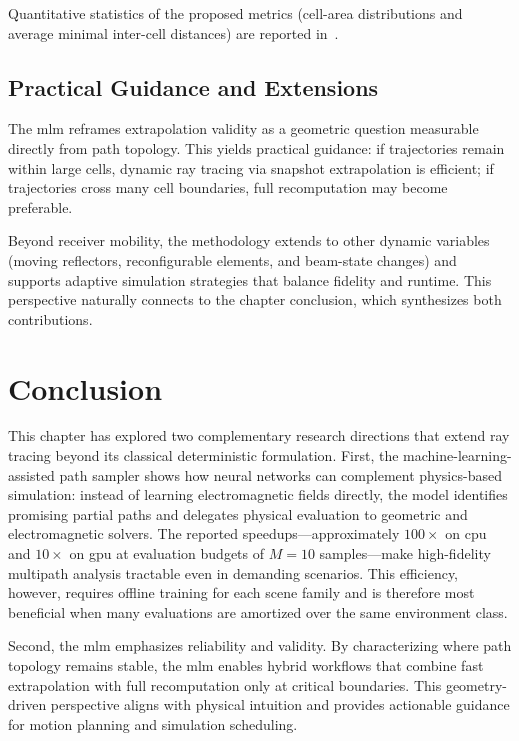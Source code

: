 Quantitative statistics of the proposed metrics (cell-area distributions and average minimal inter-cell distances) are reported in~.

\subsection{Practical Guidance and Extensions}

The \gls{mlm} reframes extrapolation validity as a geometric question measurable directly from path topology. This yields practical guidance: if trajectories remain within large cells, dynamic ray tracing via snapshot extrapolation is efficient; if trajectories cross many cell boundaries, full recomputation may become preferable.

Beyond receiver mobility, the methodology extends to other dynamic variables (moving reflectors, reconfigurable elements, and beam-state changes) and supports adaptive simulation strategies that balance fidelity and runtime. This perspective naturally connects to the chapter conclusion, which synthesizes both contributions.

\section{Conclusion}

This chapter has explored two complementary research directions that extend ray tracing beyond its classical deterministic formulation. First, the machine-learning-assisted path sampler shows how neural networks can complement physics-based simulation: instead of learning electromagnetic fields directly, the model identifies promising partial paths and delegates physical evaluation to geometric and electromagnetic solvers. The reported speedups---approximately $100\times$ on \gls{cpu} and $10\times$ on \gls{gpu} at evaluation budgets of $M=10$ samples---make high-fidelity multipath analysis tractable even in demanding scenarios. This efficiency, however, requires offline training for each scene family and is therefore most beneficial when many evaluations are amortized over the same environment class.

Second, the \gls{mlm} emphasizes reliability and validity. By characterizing where path topology remains stable, the \gls{mlm} enables hybrid workflows that combine fast extrapolation with full recomputation only at critical boundaries. This geometry-driven perspective aligns with physical intuition and provides actionable guidance for motion planning and simulation scheduling.

